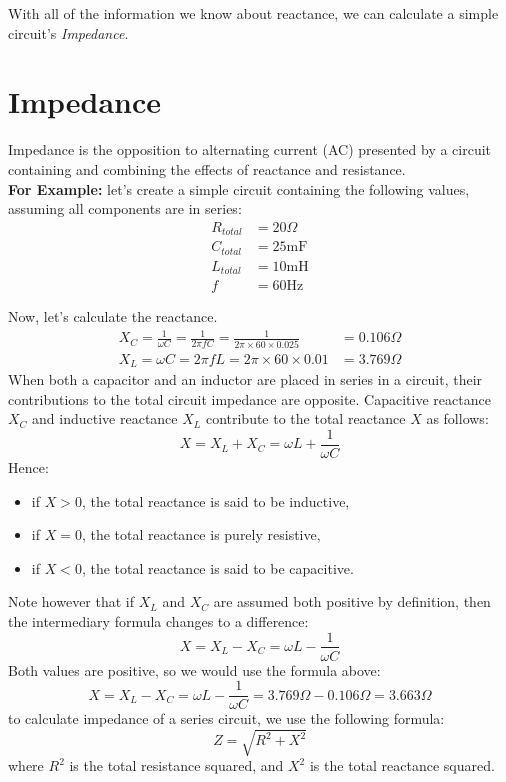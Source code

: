 \documentclass[12pt,a4paper,oneside]{article}
\begin{document}
With all of the information we know about reactance, we can calculate a simple circuit's \textit{Impedance}.
\section{Impedance}
Impedance is the opposition to alternating current (AC) presented by a circuit containing and combining the effects of reactance and resistance. \\
\textbf{For Example:} let's create a simple circuit containing the following values, assuming all components are in series:
\begin{align*}
	R_{total} &= 20\Omega \\
	C_{total} &= 25\text{mF} \\
	L_{total} &= 10\text{mH} \\
	f &= 60\text{Hz}
\end{align*}

Now, let's calculate the reactance.
\begin{align*}
	X_C = \frac{1}{\omega C} = \frac{1}{2 \pi f C} = \frac{1}{2 \pi \times 60 \times 0.025} &= 0.106\Omega \\
	X_L = \omega C = 2 \pi f L = 2 \pi \times 60 \times 0.01 &= 3.769\Omega
\end{align*}
When both a capacitor and an inductor are placed in series in a circuit, their contributions to the total circuit impedance are opposite. Capacitive reactance \(X_C\) and inductive reactance \(X_L\) contribute to the total reactance \(X\) as follows:
\[
	X = X_L + X_C = \omega L + \frac{1}{\omega C}
\]
Hence:
\begin{itemize}
	\item if \(X>0\), the total reactance is said to be inductive,
	\item if \(X=0\), the total reactance is purely resistive,
	\item if \(X<0\), the total reactance is said to be capacitive.
\end{itemize}
Note however that if \(X_L\) and \(X_C\) are assumed both positive by definition, then the intermediary formula changes to a difference:
\[
	X = X_L - X_C = \omega L - \frac{1}{\omega C}
\]
Both values are positive, so we would use the formula above:
\[
	X = X_L - X_C = \omega L - \frac{1}{\omega C} = 3.769\Omega - 0.106\Omega = 3.663\Omega
\]
to calculate impedance of a series circuit, we use the following formula:
\[
	Z = \sqrt{R^2 + X^2}
\]
where \(R^2\) is the total resistance squared, and \(X^2\) is the total reactance squared.
\end{document}
